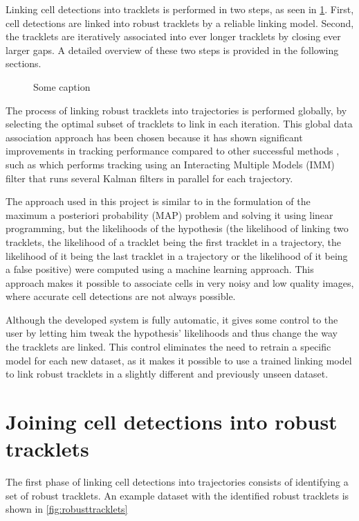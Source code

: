		Linking cell detections into tracklets is performed in two steps, as seen in \cref{fig:trackingoveriew}. First, cell detections are linked into robust tracklets by a reliable linking model. Second, the tracklets are iteratively  associated into ever longer tracklets by closing ever larger gaps. A detailed overview of these two steps is provided in the following sections.
	
		\begin{figure}[h]
			\centering
			\caption{Some caption}
			\label{fig:trackingoveriew}
		\end{figure}
		
		The process of linking robust tracklets into trajectories is performed globally, by selecting the optimal subset of tracklets to link in each iteration. This global data association approach has been chosen because it has shown significant improvements in tracking performance compared to other successful methods \cite{bise11global}, such as \cite{li08} which performs tracking using an Interacting Multiple Models (IMM) filter that runs several Kalman filters in parallel for each trajectory.
		
		The approach used in this project is similar to \cite{bise11} in the formulation of the maximum a posteriori probability (MAP) problem and solving it using linear programming, but the likelihoods of the hypothesis (the likelihood of linking two tracklets, the likelihood of a tracklet being the first tracklet in a trajectory, the likelihood of it being the last tracklet in a trajectory or the likelihood of it being a false positive) were computed using a machine learning approach. This approach makes it possible to associate cells in very noisy and low quality images, where accurate cell detections are not always possible.
		
		Although the developed system is fully automatic, it gives some control to the user by letting him tweak the hypothesis' likelihoods and thus change the way the tracklets are linked. This control eliminates the need to retrain a specific model for each new dataset, as it makes it possible to use a trained linking model to link robust tracklets in a slightly different and previously unseen dataset.
	
	\section{Joining cell detections into robust tracklets \statusfirstdraft}
		\label{sec:tracking_robusttracklets}
		The first phase of linking cell detections into trajectories consists of identifying a set of robust tracklets. An example dataset with the identified robust tracklets is shown in \cref{fig:robusttracklets}
		
